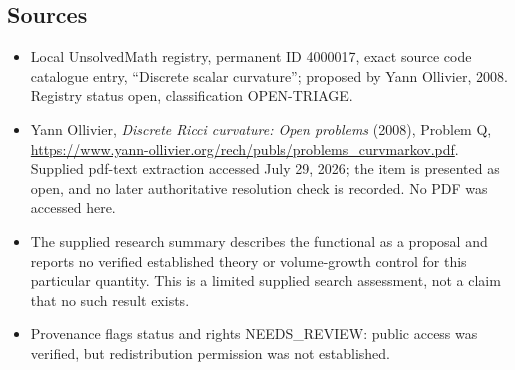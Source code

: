 \documentclass[11pt]{article}
\begin{document}
\subsection{Sources}
\begin{itemize}
\item Local UnsolvedMath registry, permanent ID 4000017, exact source code catalogue entry, ``Discrete scalar curvature''; proposed by Yann Ollivier, 2008. Registry status open, classification OPEN-TRIAGE.
\item Yann Ollivier, \emph{Discrete Ricci curvature: Open problems} (2008), Problem Q, \url{https://www.yann-ollivier.org/rech/publs/problems_curvmarkov.pdf}. Supplied pdf-text extraction accessed July 29, 2026; the item is presented as open, and no later authoritative resolution check is recorded. No PDF was accessed here.
\item The supplied research summary describes the functional as a proposal and reports no verified established theory or volume-growth control for this particular quantity. This is a limited supplied search assessment, not a claim that no such result exists.
\item Provenance flags status and rights NEEDS\_REVIEW: public access was verified, but redistribution permission was not established.
\end{itemize}
\end{document}
